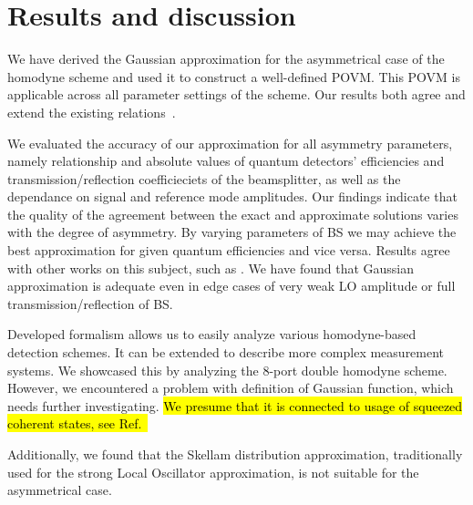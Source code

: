 \documentclass[]{article}
\begin{document}

%
\section{Results and discussion}\label{sec-results}
We have derived the Gaussian approximation for the asymmetrical case of the homodyne scheme and used it to construct a well-defined POVM. This POVM is applicable across all parameter settings of the scheme. Our results both agree and extend the existing relations~\cite{braunstein1990homodyne}.

We evaluated the accuracy of our approximation {for all asymmetry parameters, namely relationship and absolute values of quantum detectors' efficiencies and transmission/reflection coefficieciets of the beamsplitter, as well as the dependance on signal and reference mode amplitudes}. Our findings indicate that the quality of the agreement between the exact and approximate solutions varies with the degree of asymmetry. By varying parameters of BS we may achieve the best approximation for given quantum efficiencies and vice versa. Results agree with other works on this subject, such as \cite{OLIVARES2020126354}. {We have found that Gaussian approximation is adequate even in edge cases of very weak LO amplitude or full transmission/reflection of BS.}

Developed formalism allows us to easily analyze various homodyne-based detection schemes. It can be extended to describe more complex measurement systems. We showcased this by analyzing the $8$-port double homodyne scheme. However, we encountered a problem with definition of Gaussian function, which needs further investigating. \hl{We presume that it is connected to usage of squeezed coherent states, see Ref.{~\cite{doi:10.1080/09500348714550131}}}

Additionally, we found that the {Skellam distribution approximation}, traditionally used for the strong Local Oscillator approximation, is not suitable for the asymmetrical case. 

\end{document}
